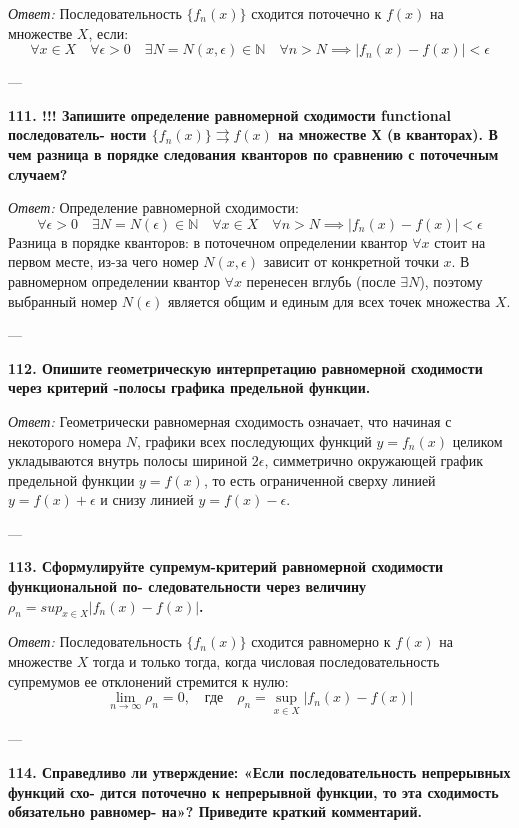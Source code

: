 \documentclass{article}
\begin{document}
\textit{Ответ:} Последовательность $\{f_n(x)\}$ сходится поточечно к $f(x)$ на множестве $X$, если:
$$ \forall x \in X \quad \forall \epsilon > 0 \quad \exists N = N(x, \epsilon) \in \mathbb{N} \quad \forall n > N \implies |f_n(x) - f(x)| < \epsilon $$

---

\textbf{111. !!! Запишите определение равномерной сходимости functional последователь- ности $\{f_{n}(x)\}\rightrightarrows f(x)$ на множестве Х (в кванторах). В чем разница в порядке следования кванторов по сравнению с поточечным случаем?}

\textit{Ответ:} Определение равномерной сходимости:
$$ \forall \epsilon > 0 \quad \exists N = N(\epsilon) \in \mathbb{N} \quad \forall x \in X \quad \forall n > N \implies |f_n(x) - f(x)| < \epsilon $$
Разница в порядке кванторов: в поточечном определении квантор $\forall x$ стоит на первом месте, из-за чего номер $N(x, \epsilon)$ зависит от конкретной точки $x$. В равномерном определении квантор $\forall x$ перенесен вглубь (после $\exists N$), поэтому выбранный номер $N(\epsilon)$ является общим и единым для всех точек множества $X$.

---

\textbf{112. Опишите геометрическую интерпретацию равномерной сходимости через критерий -полосы графика предельной функции.}

\textit{Ответ:} Геометрически равномерная сходимость означает, что начиная с некоторого номера $N$, графики всех последующих функций $y = f_n(x)$ целиком укладываются внутрь полосы шириной $2\epsilon$, симметрично окружающей график предельной функции $y = f(x)$, то есть ограниченной сверху линией $y = f(x) + \epsilon$ и снизу линией $y = f(x) - \epsilon$.

---

\textbf{113. Сформулируйте супремум-критерий равномерной сходимости функциональной по- следовательности через величину $\rho_{n}=sup_{x\in X}|f_{n}(x)-f(x)|$.}

\textit{Ответ:} Последовательность $\{f_n(x)\}$ сходится равномерно к $f(x)$ на множестве $X$ тогда и только тогда, когда числовая последовательность супремумов ее отклонений стремится к нулю:
$$ \lim_{n \to \infty} \rho_n = 0, \quad \text{где} \quad \rho_n = \sup_{x \in X} |f_n(x) - f(x)| $$

---

\textbf{114. Справедливо ли утверждение: «Если последовательность непрерывных функций схо- дится поточечно к непрерывной функции, то эта сходимость обязательно равномер- на»? Приведите краткий комментарий.}
\end{document}
